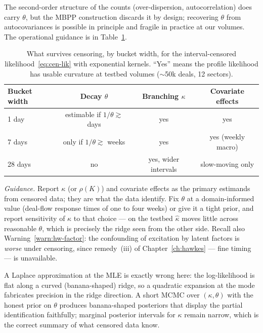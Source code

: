 The second-order structure of the counts (over-dispersion, autocorrelation) does carry
$\theta$, but the MBPP construction discards it by design; recovering $\theta$ from
autocovariances is possible in principle and fragile in practice at our volumes. The
operational guidance is in Table~\ref{tab:cen-widths}.

\begin{table}[htbp]
\centering
\small
\begin{tabular}{lccc}
\toprule
Bucket width & Decay $\theta$ & Branching $\kappa$ & Covariate effects \\
\midrule
1 day  & estimable if $1/\theta \gtrsim$ days & yes & yes \\
7 days & only if $1/\theta \gtrsim$ weeks & yes & yes (weekly macro) \\
28 days & no & yes, wider intervals & slow-moving only \\
\bottomrule
\end{tabular}
\caption{What survives censoring, by bucket width, for the interval-censored
likelihood~\eqref{eq:cen-lik} with exponential kernels. ``Yes'' means the profile
likelihood has usable curvature at testbed volumes ($\sim$50k deals, 12 sectors).}
\label{tab:cen-widths}
\end{table}

\emph{Guidance.} Report $\kappa$ (or $\rho(K)$) and covariate effects as the primary
estimands from censored data; they are what the data identify. Fix $\theta$ at a
domain-informed value (deal-flow response times of one to four weeks) or give it a tight
prior, and report sensitivity of $\kappa$ to that choice --- on the testbed $\hat\kappa$
moves little across reasonable $\theta$, which is precisely the ridge seen from the other
side. Recall also Warning~\ref{warn:hw-factor}: the confounding of excitation by latent
factors is \emph{worse} under censoring, since remedy~(iii) of
Chapter~\ref{ch:hawkes} --- fine timing --- is unavailable.

\begin{remark}
\label{rem:cen-banana}
A Laplace approximation at the MLE is exactly wrong here: the log-likelihood is flat along
a curved (banana-shaped) ridge, so a quadratic expansion at the mode fabricates precision
in the ridge direction. A short MCMC over $(\kappa, \theta)$ with the honest prior on
$\theta$ produces banana-shaped posteriors that display the partial identification
faithfully; marginal posterior intervals for $\kappa$ remain narrow, which is the
correct summary of what censored data know.
\end{remark}

